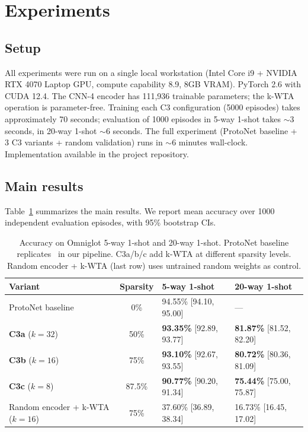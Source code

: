 \documentclass[11pt]{article}
\begin{document}
\section{Experiments}
\label{sec:experiments}

\subsection{Setup}

All experiments were run on a single local workstation (Intel Core i9 + NVIDIA RTX 4070 Laptop GPU, compute capability 8.9, 8GB VRAM). PyTorch 2.6 with CUDA 12.4. The CNN-4 encoder has 111{,}936 trainable parameters; the k-WTA operation is parameter-free. Training each C3 configuration (5000 episodes) takes approximately 70 seconds; evaluation of 1000 episodes in 5-way 1-shot takes $\sim$3 seconds, in 20-way 1-shot $\sim$6 seconds. The full experiment (ProtoNet baseline + 3 C3 variants + random validation) runs in $\sim$6 minutes wall-clock. Implementation available in the project repository.

\subsection{Main results}

Table~\ref{tab:main} summarizes the main results. We report mean accuracy over 1000 independent evaluation episodes, with 95\% bootstrap CIs.

\begin{table}[htbp]
\centering
\small
\caption{Accuracy on Omniglot 5-way 1-shot and 20-way 1-shot. ProtoNet baseline replicates~\citet{snell2017prototypical} in our pipeline. C3a/b/c add k-WTA at different sparsity levels. Random encoder + k-WTA (last row) uses untrained random weights as control.}
\label{tab:main}
\begin{tabular}{lcll}
\toprule
Variant & Sparsity & 5-way 1-shot & 20-way 1-shot \\
\midrule
ProtoNet baseline & 0\% & 94.55\% [94.10, 95.00] & --- \\
\textbf{C3a} ($k=32$) & 50\% & \textbf{93.35\%} [92.89, 93.77] & \textbf{81.87\%} [81.52, 82.20] \\
\textbf{C3b} ($k=16$) & 75\% & \textbf{93.10\%} [92.67, 93.55] & \textbf{80.72\%} [80.36, 81.09] \\
\textbf{C3c} ($k=8$) & 87.5\% & \textbf{90.77\%} [90.20, 91.34] & \textbf{75.44\%} [75.00, 75.87] \\
\midrule
Random encoder + k-WTA ($k=16$) & 75\% & 37.60\% [36.89, 38.34] & 16.73\% [16.45, 17.02] \\
\bottomrule
\end{tabular}
\end{table}
\end{document}
